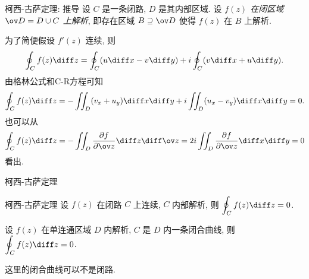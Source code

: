 \begin{frame}{柯西-古萨定理: 推导}
	\onslide<+->
	设 $C$ 是一条闭路, $D$ 是其内部区域.
	\onslide<+->
	设 \emph{$f(z)$ 在闭区域 $\ov D=D\cup C$ 上解析},
	\onslide<+->
	即存在区域 $B\supseteq\ov D$ 使得 $f(z)$ 在 $B$ 上解析.

	\onslide<+->
	为了简便假设 $f'(z)$ 连续,
	\onslide<+->
	则
	\[\oint_Cf(z)\diff z=\oint_C(u\diff x-v\diff y)
	+i\oint_C(v\diff x+u\diff y).\]
	\onslide<+->
	由格林公式和C-R方程可知
	\[\oint_Cf(z)\diff z=-\iint_D(v_x+u_y)\diff x\diff y
	+i\iint_D(u_x-v_y)\diff x\diff y=0.\]
	\onslide<+->
	也可以从
	\[\oint_Cf(z)\diff z=-\iint_D\frac{\partial f}{\partial \ov z}\diff z\diff \ov z=2i\iint_D\frac{\partial f}{\partial \ov z}\diff x\diff y=0\]
	看出.
\end{frame}


\begin{frame}{柯西-古萨定理}
	\onslide<+->
	\begin{algorithm}{柯西-古萨定理}
	设 $f(z)$ 在闭路 $C$ 上连续, $C$ 内部解析, 则 $\displaystyle\oint_Cf(z)\diff z=0$.
	\end{algorithm}

	\onslide<+->
	\begin{corollary}
	设 $f(z)$ 在\alert{单连通区域} $D$ 内解析, $C$ 是 $D$ 内一条闭合曲线, 则 $\displaystyle\oint_Cf(z)\diff z=0$.
	\end{corollary}
	\onslide<+->
	这里的闭合曲线可以不是闭路.

\end{frame}


